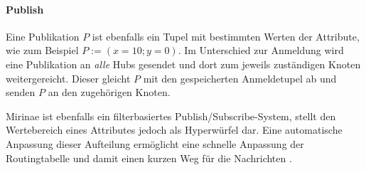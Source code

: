 \paragraph{Publish}
Eine Publikation $P$ ist ebenfalls ein Tupel mit bestimmten Werten der Attribute, wie zum Beispiel $P := (x = 10; y = 0)$. Im Unterschied zur Anmeldung wird eine Publikation an \emph{alle} Hubs gesendet und dort zum jeweils zuständigen Knoten weitergereicht. Dieser gleicht $P$ mit den gespeicherten Anmeldetupel ab und senden $P$ an den zugehörigen Knoten.

Mirinae ist ebenfalls ein filterbasiertes Publish/Subscribe-System, stellt den Wertebereich eines Attributes jedoch als Hyperwürfel dar. Eine automatische Anpassung dieser Aufteilung ermöglicht eine schnelle Anpassung der Routingtabelle und damit einen kurzen Weg für die Nachrichten \cite{Choi2005Mirinae}.
